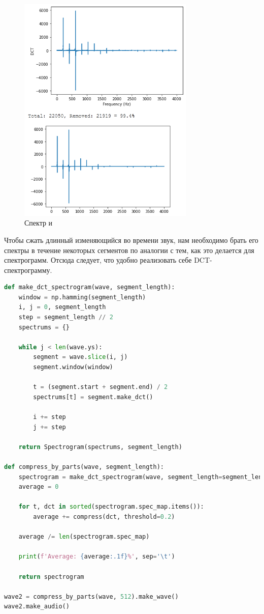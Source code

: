 \documentclass[a4paper,12pt]{report}
\begin{document}
    \begin{figure}[H]
        \centering
        \includegraphics[width=0.75\textwidth]{images/ex2_segment.png}
        \caption{Спектр  и }
        \label{fig:ex2_segment}
    \end{figure}
    
    Чтобы сжать длинный изменяющийся во времени звук, нам необходимо брать его спектры в течение некоторых сегментов по аналогии с тем, как это делается для спектрограмм. Отсюда следует, что удобно реализовать себе DCT-спектрограмму.
    
\begin{lstlisting}[language=Python,caption=Сжатие длинного звука]
def make_dct_spectrogram(wave, segment_length):
    window = np.hamming(segment_length)
    i, j = 0, segment_length
    step = segment_length // 2
    spectrums = {}

    while j < len(wave.ys):
        segment = wave.slice(i, j)
        segment.window(window)

        t = (segment.start + segment.end) / 2
        spectrums[t] = segment.make_dct()

        i += step
        j += step

    return Spectrogram(spectrums, segment_length)

def compress_by_parts(wave, segment_length):
    spectrogram = make_dct_spectrogram(wave, segment_length=segment_length)
    average = 0
    
    for t, dct in sorted(spectrogram.spec_map.items()):
        average += compress(dct, threshold=0.2)
        
    average /= len(spectrogram.spec_map)
    
    print(f'Average: {average:.1f}%', sep='\t')
    
    return spectrogram

wave2 = compress_by_parts(wave, 512).make_wave()
wave2.make_audio()
\end{lstlisting}
\end{document}
